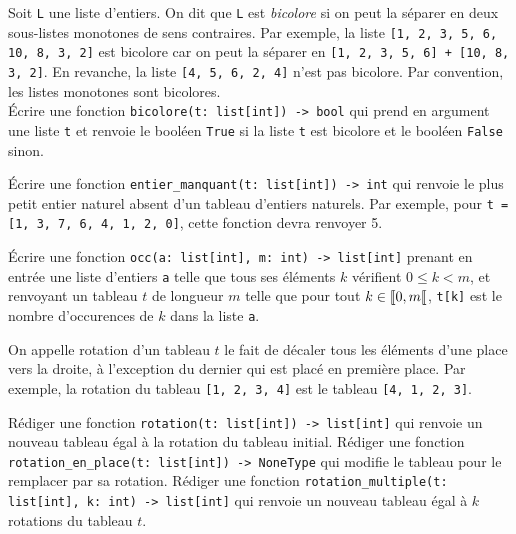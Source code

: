 \documentclass{magnolia}
\begin{document}

Soit {\tt L} une liste d'entiers. On dit que {\tt L} est {\it bicolore} si on peut la séparer en deux sous-listes monotones de sens contraires. Par exemple, la liste {\tt [1, 2, 3, 5, 6, 10, 8, 3, 2]} est bicolore car on peut la séparer en {\tt [1, 2, 3, 5, 6] + [10, 8, 3, 2]}. En revanche, la liste {\tt [4, 5, 6, 2, 4]} n'est pas bicolore. Par convention, les listes monotones sont bicolores.\\

Écrire une fonction {\tt bicolore(t: list[int]) -> bool} qui prend en argument une liste
{\tt t} et renvoie le booléen {\tt True} si la liste {\tt t} est bicolore et le booléen {\tt False} sinon.

Écrire une fonction \verb!entier_manquant(t: list[int]) -> int! qui renvoie le plus petit entier naturel absent
d'un tableau d'entiers naturels. Par exemple, pour \verb!t = [1, 3, 7, 6, 4, 1, 2, 0]!, cette fonction devra
renvoyer 5.


Écrire une fonction \verb!occ(a: list[int], m: int) -> list[int]! prenant en entrée une liste d'entiers
\verb!a! telle que tous ses éléments $k$ vérifient $0\leq k<m$, et renvoyant un tableau $t$ de longueur
$m$ telle que pour tout $k\in\left\llbracket 0,m\right\llbracket$, \verb!t[k]! est le nombre d'occurences de $k$ dans la
liste \verb!a!.



On appelle rotation d'un tableau $t$ le fait de décaler tous les éléments d'une place vers
la droite, à l'exception du dernier qui est placé en première place. Par exemple, la rotation
du tableau \verb![1, 2, 3, 4]! est le tableau \verb![4, 1, 2, 3]!.
\begin{questions}
\question Rédiger une fonction \verb!rotation(t: list[int]) -> list[int]! qui renvoie un nouveau tableau égal à la
  rotation du tableau initial.
\question Rédiger une fonction \verb!rotation_en_place(t: list[int]) -> NoneType! qui modifie le tableau pour le
  remplacer par sa rotation.
\question Rédiger une fonction \verb!rotation_multiple(t: list[int], k: int) -> list[int]! qui renvoie un nouveau tableau
  égal à $k$ rotations du tableau $t$.
\end{questions}
\end{document}

